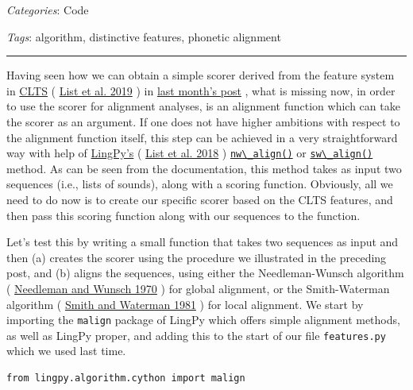 \documentclass[
  a4paper,
  14pt,
  oneside,
  tablecaptionabove
]{scrbook}
\newcommand{\passthrough}[1]{#1}
\begin{document}
\emph{Categories}: Code

\emph{Tags}: algorithm, distinctive features, phonetic alignment

\begin{center}\rule{0.5\linewidth}{1pt}\end{center}

Having seen how we can obtain a simple scorer derived from the feature
system in \href{https://clts.clld.org}{CLTS} (
\href{http://bibliography.lingpy.org?key=CLTS}{List et al. 2019} ) in
\href{https://calc.hypotheses.org/1962}{last month's post} , what is
missing now, in order to use the scorer for alignment analyses, is an
alignment function which can take the scorer as an argument. If one does
not have higher ambitions with respect to the alignment function itself,
this step can be achieved in a very straightforward way with help of
\href{http://lingpy.org}{LingPy's} (
\href{http://bibliography.lingpy.org?key=LingPy}{List et al. 2018} )
\href{http://lingpy.org/reference/lingpy.algorithm.cython.html\#lingpy.algorithm.cython.malign.nw_align}{\passthrough{\lstinline!nw\_align()!}}
or
\href{http://lingpy.org/reference/lingpy.algorithm.cython.html\#lingpy.algorithm.cython.malign.sw_align}{\passthrough{\lstinline!sw\_align()!}}
method. As can be seen from the documentation, this method takes as
input two sequences (i.e., lists of sounds), along with a scoring
function. Obviously, all we need to do now is to create our specific
scorer based on the CLTS features, and then pass this scoring function
along with our sequences to the function.

Let's test this by writing a small function that takes two sequences as
input and then (a) creates the scorer using the procedure we illustrated
in the preceding post, and (b) aligns the sequences, using either the
Needleman-Wunsch algorithm (
\href{http://bibliography.lingpy.org?key=Needleman1970}{Needleman and
Wunsch 1970} ) for global alignment, or the Smith-Waterman algorithm (
\href{http://bibliography.lingpy.org?key=Smith1981}{Smith and Waterman
1981} ) for local alignment. We start by importing the
\passthrough{\lstinline!malign!} package of LingPy which offers simple
alignment methods, as well as LingPy proper, and adding this to the
start of our file \passthrough{\lstinline!features.py!} which we used
last time.

\begin{lstlisting}
from lingpy.algorithm.cython import malign
\end{lstlisting}
\end{document}
